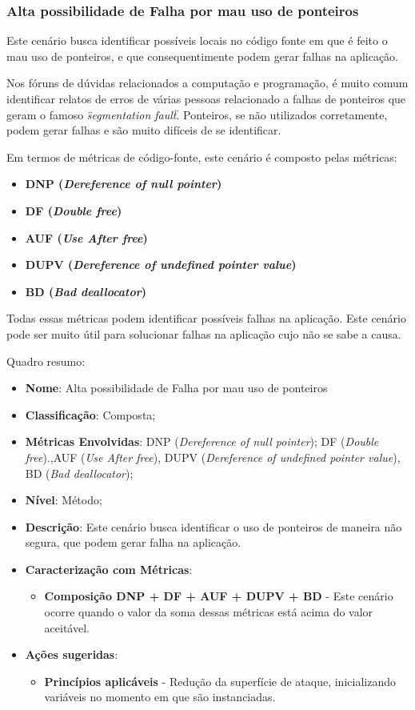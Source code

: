 \subsubsection{Alta possibilidade de Falha por mau uso de ponteiros}
Este cenário busca identificar possíveis locais no código fonte em que é feito o mau uso de ponteiros, e que consequentimente podem gerar falhas na aplicação. 

Nos fóruns de dúvidas relacionados a computação e programação, é muito comum identificar relatos de erros de várias pessoas relacionado a falhas de ponteiros que geram o famoso \emph{\"segmentation fault\"}. Ponteiros, se não utilizados corretamente, podem gerar falhas e são muito difíceis de se identificar.

Em termos de métricas de código-fonte, este cenário é composto pelas métricas:
\begin{itemize}
	\item \textbf{DNP (\emph{Dereference of null pointer})}
	\item \textbf{DF (\emph{Double free})}
	\item \textbf{AUF (\emph{Use After free})}
	\item \textbf{DUPV (\emph{Dereference of undefined pointer value})}
	\item \textbf{BD (\emph{Bad deallocator})}
\end{itemize}

Todas essas métricas podem identificar possíveis falhas na aplicação. Este cenário pode ser muito útil para solucionar falhas na aplicação cujo não se sabe a causa.

Quadro resumo:

\begin{itemize}
\item \textbf{Nome}: Alta possibilidade de Falha por mau uso de ponteiros
\item \textbf{Classificação}: Composta;
\item \textbf{Métricas Envolvidas}: DNP (\emph{Dereference of null pointer}); DF (\emph{Double free}).,AUF (\emph{Use After free}), DUPV (\emph{Dereference of undefined pointer value}), BD (\emph{Bad deallocator});
\item \textbf{Nível}: Método;
\item \textbf{Descrição}: Este cenário busca identificar o uso de ponteiros de maneira não segura, que podem gerar falha na aplicação.
\item \textbf{Caracterização com Métricas}: 
	\begin{itemize}
	\item \textbf{Composição DNP + DF + AUF + DUPV + BD} - Este cenário ocorre quando o valor da soma dessas métricas está acima do valor aceitável.
	\end{itemize}
\item \textbf{Ações sugeridas}: 
	\begin{itemize}
	\item \textbf{Princípios aplicáveis} - Redução da superfície de ataque, inicializando variáveis no momento em que são instanciadas.
	\end{itemize}
\end{itemize}


